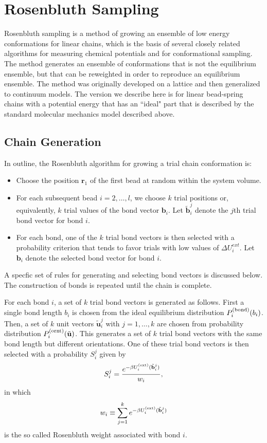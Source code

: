 \documentclass[12pt]{article} %
\newcommand{\vv}[1]{\mathbf{#1}}
\newcommand\delU{\Delta U}
\newcommand\Uext{U^{({\rm ext})}}
\newcommand\qbead{\vv{r}_{1}}
\newcommand\nbead{l}
\newcommand\vbond{\vv{b}}
\newcommand\rbond{b}
\newcommand\ntrial{k}
\newcommand\vtrial{\tilde{\vv{b}}}
\newcommand\utrial{\tilde{\vv{u}}}
\newcommand\Pbond{P^{({\rm bond})}}
\newcommand\Pornt{P^{({\rm ornt})}}
\begin{document}
\section{Rosenbluth Sampling} %
Rosenbluth sampling is a method of growing an ensemble of low energy conformations for linear chains, which is the basis of several closely related algorithms for measuring chemical potentials and for conformational sampling. The method generates an ensemble of conformations that is not the equilibrium ensemble, but that can be reweighted in order to reproduce an equilibrium ensemble. The method was originally developed on a lattice and then generalized to continuum models. The version we describe here is for linear bead-spring chains with a potential energy that has an ``ideal" part that is described by the standard molecular mechanics model described above. 

\subsection{Chain Generation}
In outline, the Rosenbluth algorithm for growing a trial chain conformation is:
\begin{itemize}
\item Choose the position $\qbead$ of the first bead at random within the system 
      volume.
\item For each subsequent bead $i=2,\ldots, \nbead$, we choose $\ntrial$ trial 
positions or, equivalently, $\ntrial$ trial values of the bond vector $\vbond_{i}$. 
Let $\vtrial_{i}^{j}$ denote the $j$th trial bond vector for bond $i$.
\item For each bond, one of the $\ntrial$ trial bond vectors is then selected with a 
probability criterion that tends to favor trials with low values of $\delU^{ext}_{i}$.
Let $\vbond_{i}$ denote the selected bond vector for bond $i$.  
\end{itemize} 
A specfic set of rules for generating and selecting bond vectors is discussed below.  The construction of bonds is repeated until the chain is complete.

For each bond $i$, a set of $\ntrial$ trial bond vectors is generated as follows.
First a single bond length $\rbond_{i}$ is chosen from the ideal equilibrium 
distribution $\Pbond_{i}(\rbond_{i})$. Then, a set of $\ntrial$ unit vectors 
$\utrial_{i}^{j}$ with $j=1,\ldots,\ntrial$ are chosen from probability distribution 
$\Pornt_{i}(\utrial)$.  This generates a set of $\ntrial$ trial bond vectors with 
the same bond length but different orientations.  One of these trial bond vectors 
is then selected with a probability $S^{j}_{i}$ given by
\begin{equation}
    S^{j}_{i} = \frac{e^{-\beta\Uext_{i}(\vtrial^{j}_{i})}}{w_{i}}
    \label{PtrialSelection},
\end{equation}
in which 
\begin{equation}
     w_{i} \equiv \sum_{j=1}^{\ntrial} e^{ -\beta \Uext_{i}(\vtrial^{j}_{i})}
     \label{RosenbluthBond}
\end{equation}
is the so called Rosenbluth weight associated with bond $i$.
\end{document}
